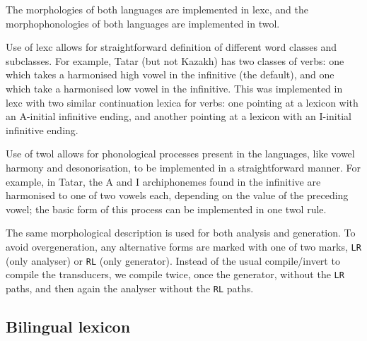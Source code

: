 \documentclass[a4paper,11pt]{article}
\begin{document}
The morphologies of both languages are implemented in lexc, and the morphophonologies of both languages are implemented in twol.

Use of lexc allows for straightforward definition of different word classes and subclasses.  For example, Tatar (but not Kazakh) has two classes of verbs: one which takes a harmonised high vowel in the infinitive (the default), and one which take a harmonised low vowel in the infinitive.  This was implemented in lexc with two similar continuation lexica for verbs: one pointing at a lexicon with an A-initial infinitive ending, and another pointing at a lexicon with an I-initial infinitive ending.

Use of twol allows for phonological processes present in the languages, like vowel harmony and desonorisation, to be implemented in a straightforward manner.  For example, in Tatar, the A and I archiphonemes found in the infinitive are harmonised to one of two vowels each, depending on the value of the preceding vowel; the basic form of this process can be implemented in one twol rule.

The same morphological description is used for both analysis and generation. To avoid overgeneration, any alternative forms are 
marked with one of two marks, {\tt {\small LR}} (only analyser) or {\tt {\small RL}} (only generator). Instead of the usual
compile/invert to compile the transducers, we compile twice, once the generator, without the {\tt {\small LR}} paths, and
then again the analyser without the {\tt {\small RL}} paths. 

\subsection{Bilingual lexicon}

	
\end{document}
